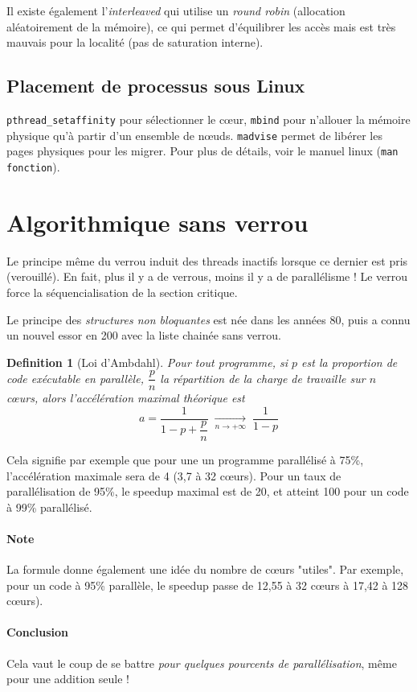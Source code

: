 \documentclass{article}
\newtheorem{defi}{Definition}
\begin{document}
Il existe également l'\emph{interleaved} qui utilise un \emph{round robin} (allocation aléatoirement de la mémoire), ce qui permet d'équilibrer les accès mais est très mauvais pour la localité (pas de saturation interne).

\subsection{Placement de processus sous Linux}
\texttt{pthread\_setaffinity} pour sélectionner le cœur, \texttt{mbind} pour n'allouer la mémoire physique qu'à partir d'un ensemble de nœuds. \texttt{madvise} permet de libérer les pages physiques pour les migrer. Pour plus de détails, voir le manuel linux (\texttt{man fonction}).


\section{Algorithmique sans verrou}
Le principe même du verrou induit des threads inactifs lorsque ce dernier est pris (verouillé). En fait, plus il y a de verrous, moins il y a de parallélisme ! Le verrou force la séquencialisation de la section critique.

Le principe des \emph{structures non bloquantes} est née dans les années 80, puis a connu un nouvel essor en 200 avec la liste chainée sans verrou. 
\bigskip

\begin{defi}[Loi d'Ambdahl]
Pour tout programme, si $p$ est la proportion de code exécutable en parallèle, $\dfrac{p}{n}$ la répartition de la charge de travaille sur $n$ cœurs, alors l'accélération maximal théorique est 
\[a = \dfrac{1}{1 - p + \dfrac{p}{n}} \;\underset{n\to +\infty}{\longrightarrow}\; \dfrac{1}{1-p}\]
\end{defi}

Cela signifie par exemple que pour une un programme parallélisé à 75\%, l'accélération maximale sera de 4 (3,7 à 32 cœurs). Pour un taux de parallélisation de 95\%, le speedup maximal est de 20, et atteint 100 pour un code à 99\% parallélisé.

\paragraph{Note}
La formule donne également une idée du nombre de cœurs "utiles". Par exemple, pour un code à 95\% parallèle, le speedup passe de 12,55 à 32 cœurs à 17,42 à 128 cœurs).

\paragraph{Conclusion} Cela vaut le coup de se battre \emph{pour quelques pourcents de parallélisation}, même pour une addition seule !
\end{document}
